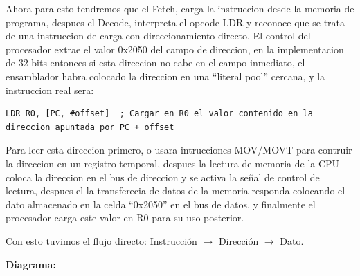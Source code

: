 \documentclass[letterpaper,12pt]{article}
\begin{document}
    Ahora para esto tendremos que el Fetch, carga la instruccion desde la memoria de programa, despues el Decode, interpreta el opcode LDR y reconoce que se trata de una instruccion de carga con direccionamiento directo. El control del procesador extrae el valor 0x2050 del campo de direccion, en la implementacion de 32 bits entonces si esta direccion no cabe en el campo inmediato, el ensamblador habra colocado la direccion en una ``literal pool'' cercana, y la instruccion real sera:
    \begin{lstlisting}[language={[x86masm]Assembler}, caption={Ejemplo de direccionamiento directo con literal pool}]
        LDR R0, [PC, #offset]  ; Cargar en R0 el valor contenido en la direccion apuntada por PC + offset
    \end{lstlisting}
    
    Para leer esta direccion primero, o usara intrucciones MOV/MOVT para contruir la direccion en un registro temporal, despues la lectura de memoria de la CPU coloca la direccion en el bus de direccion y se activa la señal de control de lectura, despues el la transferecia de datos de la memoria responda colocando el dato almacenado en la celda ``0x2050'' en el bus de datos, y finalmente el procesador carga este valor en R0 para su uso posterior.

    Con esto tuvimos el flujo directo:  Instrucción $\rightarrow$ Dirección $\rightarrow$ Dato.

    \textbf{Diagrama:}
\end{document}
